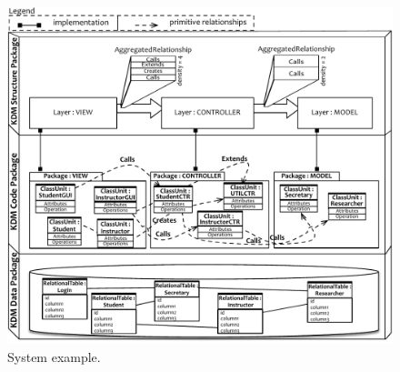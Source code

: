 \begin{figure}
	\centering
	\includegraphics[scale=0.5]{figuras/NovoSystem3}
	\caption{System example.}
	\label{fig:system}
\end{figure}




